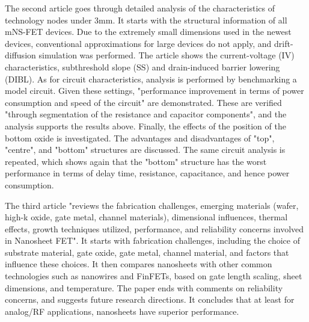 \documentclass[12pt]{article}
\begin{document}
The second article goes through detailed analysis of the characteristics of technology nodes under 3mm. It starts with the structural information of all mNS-FET devices. Due to the extremely small dimensions used in the newest devices, conventional approximations for large devices do not apply, and drift-diffusion simulation was performed. The article shows the current-voltage (IV) characteristics, subthreshold slope (SS) and drain-induced barrier lowering (DIBL). As for circuit characteristics, analysis is performed by benchmarking a model circuit. Given these settings, "performance improvement in terms of power consumption and speed of the circuit" are demonstrated. These are verified "through segmentation of the resistance and capacitor components", and the analysis supports the results above. Finally, the effects of the position of the bottom oxide is investigated. The advantages and disadvantages of "top", "centre", and "bottom" structures are discussed. The same circuit analysis is repeated, which shows again that the "bottom" structure has the worst performance in terms of delay time, resistance, capacitance, and hence power consumption.

The third article "reviews the fabrication challenges, emerging materials (wafer, high-k oxide, gate metal, channel materials), dimensional influences, thermal effects, growth techniques utilized, performance, and reliability concerns involved in Nanosheet FET". It starts with fabrication challenges, including the choice of substrate material, gate oxide, gate metal, channel material, and factors that influence these choices. It then compares nanosheets with other common technologies such as nanowires and FinFETs, based on gate length scaling, sheet dimensions, and temperature. The paper ends with comments on reliability concerns, and suggests future research directions. It concludes that at least for analog/RF applications, nanosheets have superior performance.
\end{document}
